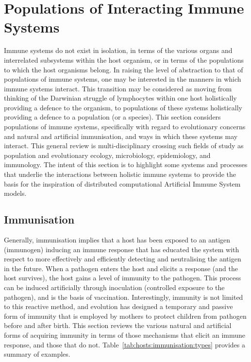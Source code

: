 %
%
\section{Populations of Interacting Immune Systems}
\label{sec:hosts:biology}
Immune systems do not exist in isolation, in terms of the various organs and interrelated subsystems within the host organism, or in terms of the populations to which the host organisms belong. In raising the level of abstraction to that of populations of immune systems, one may be interested in the manners in which immune systems interact. This transition may be considered as moving from thinking of the Darwinian struggle of lymphocytes within one host holistically providing a defence to the organism, to populations of these systems holistically providing a defence to a population (or a species). This section considers populations of immune systems, specifically with regard to evolutionary concerns and natural and artificial immunisation, and ways in which these systems may interact.  This general review is multi-disciplinary crossing such fields of study as population and evolutionary ecology, microbiology, epidemiology, and immunology. The intent of this section is to highlight some systems and processes that underlie the interactions between holistic immune systems to provide the basis for the inspiration of distributed computational Artificial Immune System models. 

%
%
\subsection{Immunisation}
\label{sec:hosts:biology:immunisation}
Generally, immunisation implies that a host has been exposed to an antigen (immunogen) inducing an immune response that has educated the system with respect to more effectively and efficiently detecting and neutralising the antigen in the future. When a pathogen enters the host and elicits a response (and the host survives), the host gains a level of immunity to the pathogen. This process can be induced artificially through inoculation (controlled exposure to the pathogen), and is the basis of vaccination. Interestingly, immunity is not limited to this reactive method, and evolution has designed a temporary and passive form of immunity that is employed by mothers to protect children from pathogen before and after birth. This section reviews the various natural and artificial forms of acquiring immunity in terms of those mechanisms that elicit an immune response, and those that do not. Table~\ref{tab:hosts:immunisation:types} provides a summary of examples.

